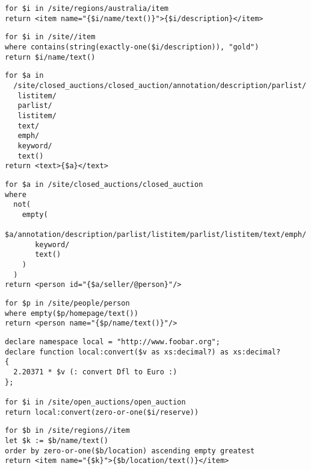 \begin{lstlisting}[float=htpb, caption=Test query 13., frame=single, label=listing_test_query_13]
for $i in /site/regions/australia/item
return <item name="{$i/name/text()}">{$i/description}</item>
\end{lstlisting}

\begin{lstlisting}[float=htpb, caption=Testing query 14., frame=single, label=listing_test_query_14]
for $i in /site//item
where contains(string(exactly-one($i/description)), "gold")
return $i/name/text()
\end{lstlisting}

\begin{lstlisting}[float=htpb, caption=Test query 15., frame=single, label=listing_test_query_15]
for $a in
  /site/closed_auctions/closed_auction/annotation/description/parlist/
   listitem/
   parlist/
   listitem/
   text/
   emph/
   keyword/
   text()
return <text>{$a}</text>
\end{lstlisting}

\begin{lstlisting}[float=htpb, caption=Test query 16., frame=single, label=listing_test_query_16]
for $a in /site/closed_auctions/closed_auction
where
  not(
    empty(
      $a/annotation/description/parlist/listitem/parlist/listitem/text/emph/
       keyword/
       text()
    )
  )
return <person id="{$a/seller/@person}"/>
\end{lstlisting}

\begin{lstlisting}[float=htpb, caption=Test query 17., frame=single, label=listing_test_query_17]
for $p in /site/people/person
where empty($p/homepage/text())
return <person name="{$p/name/text()}"/>
\end{lstlisting}

\begin{lstlisting}[float=htpb, caption=Test query 18., frame=single, label=listing_test_query_18]
declare namespace local = "http://www.foobar.org";
declare function local:convert($v as xs:decimal?) as xs:decimal?
{
  2.20371 * $v (: convert Dfl to Euro :)
};

for $i in /site/open_auctions/open_auction
return local:convert(zero-or-one($i/reserve))
\end{lstlisting}

\begin{lstlisting}[float=htpb, caption=Test query 19., frame=single, label=listing_test_query_19]
for $b in /site/regions//item
let $k := $b/name/text()
order by zero-or-one($b/location) ascending empty greatest
return <item name="{$k}">{$b/location/text()}</item>
\end{lstlisting}

